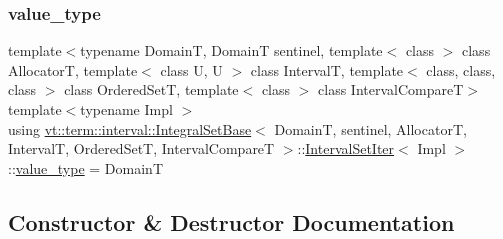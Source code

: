 \subsubsection{\texorpdfstring{value\+\_\+type}{value\_type}}
{\footnotesize\ttfamily template$<$typename DomainT, DomainT sentinel, template$<$ class $>$ class AllocatorT, template$<$ class U, U $>$ class IntervalT, template$<$ class, class, class $>$ class Ordered\+SetT, template$<$ class $>$ class Interval\+CompareT$>$ \\
template$<$typename Impl $>$ \\
using \hyperlink{structvt_1_1term_1_1interval_1_1_integral_set_base}{vt\+::term\+::interval\+::\+Integral\+Set\+Base}$<$ DomainT, sentinel, AllocatorT, IntervalT, Ordered\+SetT, Interval\+CompareT $>$\+::\hyperlink{structvt_1_1term_1_1interval_1_1_integral_set_base_1_1_interval_set_iter}{Interval\+Set\+Iter}$<$ Impl $>$\+::\hyperlink{structvt_1_1term_1_1interval_1_1_integral_set_base_1_1_interval_set_iter_abc7b9a7a287957cc11f7f8679084fad8}{value\+\_\+type} =  DomainT}



\subsection{Constructor \& Destructor Documentation}
\mbox{\label{structvt_1_1term_1_1interval_1_1_integral_set_base_1_1_interval_set_iter_ae998c7fc4e1db5a8d69ca061d70d5ceb}} 
